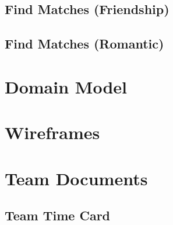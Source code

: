 \documentclass[10pt, draft]{article}
\begin{document}
\subsection{Find Matches (Friendship)}
\subsection{Find Matches (Romantic)}

\section{Domain Model}

\section{Wireframes}

\section{Team Documents}
\subsection{Team Time Card}
\end{document}
